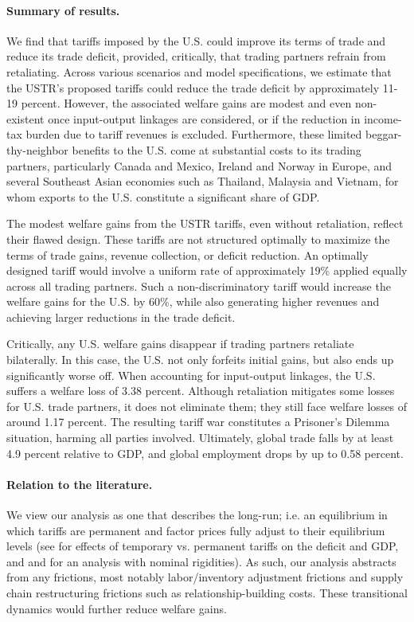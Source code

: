 \documentclass[12pt]{article}
\begin{document}
\paragraph{Summary of results.}

We find that tariffs imposed by the U.S. could improve its terms of trade and reduce its trade deficit, provided, critically, that trading partners refrain from retaliating. Across various scenarios and model specifications, we estimate that the USTR's proposed tariffs could reduce the trade deficit by approximately 11-19 percent. However, the associated welfare gains are modest and even non-existent once input-output linkages are considered, or if the reduction in income-tax burden due to tariff revenues is excluded. Furthermore, these limited beggar-thy-neighbor benefits to the U.S. come at substantial costs to its trading partners, particularly Canada and Mexico, Ireland and Norway in Europe, and several Southeast Asian economies such as Thailand, Malaysia and Vietnam, for whom exports to the U.S. constitute a significant share of GDP.

The modest welfare gains from the USTR tariffs, even without retaliation, reflect their flawed design. These tariffs are not structured optimally to maximize the terms of trade gains, revenue collection, or deficit reduction. An optimally designed tariff would involve a uniform rate of approximately 19\% applied equally across all trading partners. Such a non-discriminatory tariff would increase the welfare gains for the U.S. by 60\%, while also generating higher revenues and achieving larger reductions in the trade deficit.

Critically, any U.S. welfare gains disappear if trading partners retaliate bilaterally. In this case, the U.S. not only forfeits initial gains, but also ends up significantly worse off. When accounting for input-output linkages, the U.S. suffers a welfare loss of 3.38 percent. Although retaliation mitigates some losses for U.S. trade partners, it does not eliminate them; they still face welfare losses of around 1.17 percent. The resulting tariff war constitutes a Prisoner's Dilemma situation, harming all parties involved. Ultimately, global trade falls by at least 4.9 percent relative to GDP, and global employment drops by up to 0.58 percent.%

\paragraph{Relation to the literature.}
We view our analysis as one that describes the long-run; i.e. an equilibrium in which tariffs are permanent and factor prices fully adjust to their equilibrium levels (see \citet{Alessandria_revenue2025} for effects of temporary vs. permanent tariffs on the deficit and GDP, and \citet{Auclert2025TariffShocks} and \citet{rodriguezclare2025tradewar} for an analysis with nominal rigidities). As such, our analysis abstracts from any frictions, most notably labor/inventory adjustment frictions and supply chain restructuring frictions such as relationship-building costs. These transitional dynamics would further reduce welfare gains. 
\end{document}
